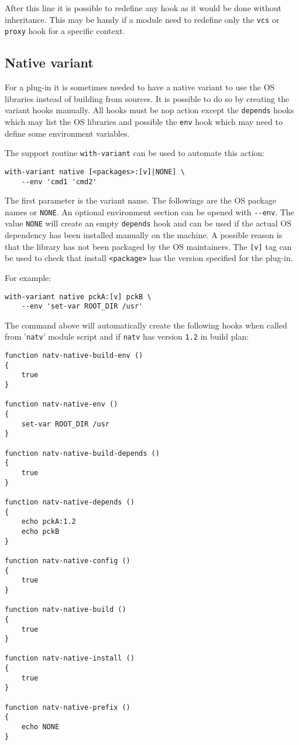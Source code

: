 \documentclass[a4paper,12pt,twoside]{article}
\newcommand{\code}[1]{\texttt{#1}}
\newcommand{\file}[1]{'{\texttt{#1}}'}
\newcommand{\ddash}{-{}-}
\begin{document}
After this line it is possible to redefine any hook as it would be done
without inheritance. This may be handy if a module need to redefine only
the \code{vcs} or \code{proxy} hook for a specific context.

\subsection{Native variant}
\label{native variant}

For a plug-in it is sometimes needed to have a native variant to use the OS libraries instead of building from sources. It is possible to do so by creating the variant hooks manually. All hooks must be nop action except the \code{depends} hooks which may list the OS libraries and possible the \code{env} hook which may need to define some environment variables.

The support routine \code{with-variant} can be used to automate this action:

\begin{lstlisting}
with-variant native [<packages>:[v]|NONE] \
	--env 'cmd1 'cmd2'
\end{lstlisting}

The first parameter is the variant name. The followings are the OS package names or \code{NONE}. An optional environment section can be opened with \code{\ddash{}env}. The value \code{NONE} will create an empty \code{depends} hook and can be used if the actual OS dependency has been installed manually on the machine. A possible reason is that the library has not been packaged by the OS maintainers. The \code{[v]} tag can be used to check that install \code{<package>} has the version specified for the plug-in.

For example:

\begin{lstlisting}
with-variant native pckA:[v] pckB \
	--env 'set-var ROOT_DIR /usr'
\end{lstlisting}

The command above will automatically create the following hooks when called from \file{natv} module script and if \code{natv} has version \code{1.2} in build plan:

\begin{lstlisting}
function natv-native-build-env ()
{
	true
}

function natv-native-env ()
{
	set-var ROOT_DIR /usr
}

function natv-native-build-depends ()
{
	true
}

function natv-native-depends ()
{
	echo pckA:1.2
	echo pckB
}

function natv-native-config ()
{
	true
}

function natv-native-build ()
{
	true
}

function natv-native-install ()
{
	true
}

function natv-native-prefix ()
{
	echo NONE
}
\end{lstlisting}
\end{document}
